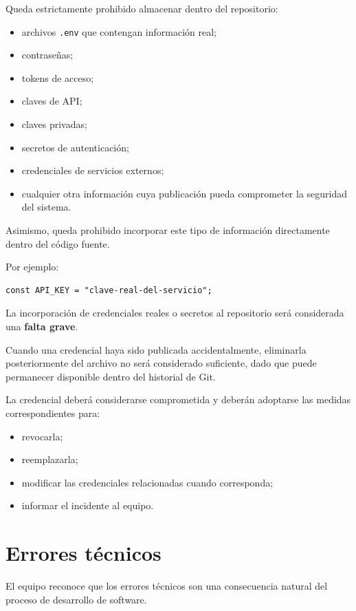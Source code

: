 \documentclass[12pt,a4paper]{article}
\begin{document}
Queda estrictamente prohibido almacenar dentro del repositorio:

\begin{itemize}
    \item archivos \texttt{.env} que contengan información real;
    \item contraseñas;
    \item tokens de acceso;
    \item claves de API;
    \item claves privadas;
    \item secretos de autenticación;
    \item credenciales de servicios externos;
    \item cualquier otra información cuya publicación pueda comprometer la seguridad del sistema.
\end{itemize}

Asimismo, queda prohibido incorporar este tipo de información directamente dentro del código fuente.

Por ejemplo:

\begin{verbatim}
const API_KEY = "clave-real-del-servicio";
\end{verbatim}

La incorporación de credenciales reales o secretos al repositorio será considerada una \textbf{falta grave}.

Cuando una credencial haya sido publicada accidentalmente, eliminarla posteriormente del archivo no será considerado suficiente, dado que puede permanecer disponible dentro del historial de Git.

La credencial deberá considerarse comprometida y deberán adoptarse las medidas correspondientes para:

\begin{itemize}
    \item revocarla;
    \item reemplazarla;
    \item modificar las credenciales relacionadas cuando corresponda;
    \item informar el incidente al equipo.
\end{itemize}

\section{Errores técnicos}

El equipo reconoce que los errores técnicos son una consecuencia natural del proceso de desarrollo de software.
\end{document}
